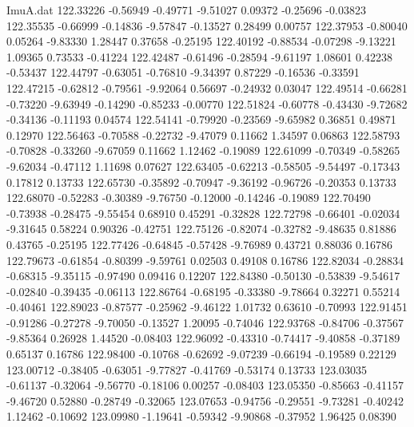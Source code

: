 \begin{filecontents}{ImuA.dat}
 122.33226   -0.56949   -0.49771   -9.51027    0.09372   -0.25696   -0.03823
 122.35535   -0.66999   -0.14836   -9.57847   -0.13527    0.28499    0.00757
 122.37953   -0.80040    0.05264   -9.83330    1.28447    0.37658   -0.25195
 122.40192   -0.88534   -0.07298   -9.13221    1.09365    0.73533   -0.41224
 122.42487   -0.61496   -0.28594   -9.61197    1.08601    0.42238   -0.53437
 122.44797   -0.63051   -0.76810   -9.34397    0.87229   -0.16536   -0.33591
 122.47215   -0.62812   -0.79561   -9.92064    0.56697   -0.24932    0.03047
 122.49514   -0.66281   -0.73220   -9.63949   -0.14290   -0.85233   -0.00770
 122.51824   -0.60778   -0.43430   -9.72682   -0.34136   -0.11193    0.04574
 122.54141   -0.79920   -0.23569   -9.65982    0.36851    0.49871    0.12970
 122.56463   -0.70588   -0.22732   -9.47079    0.11662    1.34597    0.06863
 122.58793   -0.70828   -0.33260   -9.67059    0.11662    1.12462   -0.19089
 122.61099   -0.70349   -0.58265   -9.62034   -0.47112    1.11698    0.07627
 122.63405   -0.62213   -0.58505   -9.54497   -0.17343    0.17812    0.13733
 122.65730   -0.35892   -0.70947   -9.36192   -0.96726   -0.20353    0.13733
 122.68070   -0.52283   -0.30389   -9.76750   -0.12000   -0.14246   -0.19089
 122.70490   -0.73938   -0.28475   -9.55454    0.68910    0.45291   -0.32828
 122.72798   -0.66401   -0.02034   -9.31645    0.58224    0.90326   -0.42751
 122.75126   -0.82074   -0.32782   -9.48635    0.81886    0.43765   -0.25195
 122.77426   -0.64845   -0.57428   -9.76989    0.43721    0.88036    0.16786
 122.79673   -0.61854   -0.80399   -9.59761    0.02503    0.49108    0.16786
 122.82034   -0.28834   -0.68315   -9.35115   -0.97490    0.09416    0.12207
 122.84380   -0.50130   -0.53839   -9.54617   -0.02840   -0.39435   -0.06113
 122.86764   -0.68195   -0.33380   -9.78664    0.32271    0.55214   -0.40461
 122.89023   -0.87577   -0.25962   -9.46122    1.01732    0.63610   -0.70993
 122.91451   -0.91286   -0.27278   -9.70050   -0.13527    1.20095   -0.74046
 122.93768   -0.84706   -0.37567   -9.85364    0.26928    1.44520   -0.08403
 122.96092   -0.43310   -0.74417   -9.40858   -0.37189    0.65137    0.16786
 122.98400   -0.10768   -0.62692   -9.07239   -0.66194   -0.19589    0.22129
 123.00712   -0.38405   -0.63051   -9.77827   -0.41769   -0.53174    0.13733
 123.03035   -0.61137   -0.32064   -9.56770   -0.18106    0.00257   -0.08403
 123.05350   -0.85663   -0.41157   -9.46720    0.52880   -0.28749   -0.32065
 123.07653   -0.94756   -0.29551   -9.73281   -0.40242    1.12462   -0.10692
 123.09980   -1.19641   -0.59342   -9.90868   -0.37952    1.96425    0.08390

\end{filecontents}
